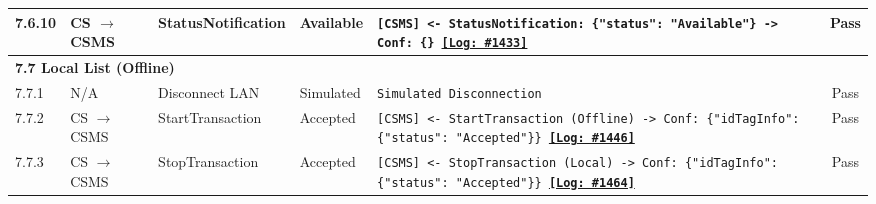 \documentclass[10pt, a4paper, landscape]{article}
\begin{document}
\begin{longtable}{|p{1.0cm}|p{2.5cm}|p{4.0cm}|p{5.0cm}|p{10.0cm}|c|}
\hline
7.6.10 & CS $\to$ CSMS & StatusNotification & Available & \footnotesize\texttt{[CSMS] <- StatusNotification: \{"status": "Available"\} \newline [CSMS] -> Conf: \{\} \newline \hyperref[log:7.6.10]{\textbf{[Log: \#1433]}}} & Pass \\
\hline
\multicolumn{6}{|l|}{\textbf{7.7 Local List (Offline)}} \\
\hline
7.7.1 & N/A & Disconnect LAN & Simulated & \footnotesize\texttt{Simulated Disconnection} & Pass \\
\hline
7.7.2 & CS $\to$ CSMS & StartTransaction & Accepted & \footnotesize\texttt{[CSMS] <- StartTransaction (Offline) \newline [CSMS] -> Conf: \{"idTagInfo": \{"status": "Accepted"\}\} \newline \hyperref[log:7.7.2]{\textbf{[Log: \#1446]}}} & Pass \\
\hline
7.7.3 & CS $\to$ CSMS & StopTransaction & Accepted & \footnotesize\texttt{[CSMS] <- StopTransaction (Local) \newline [CSMS] -> Conf: \{"idTagInfo": \{"status": "Accepted"\}\} \newline \hyperref[log:7.7.3]{\textbf{[Log: \#1464]}}} & Pass \\
\hline


\end{longtable}
\end{document}
